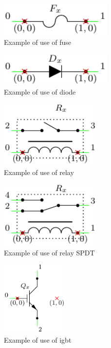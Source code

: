\documentclass[a4paper,12pt]{report}
\begin{document}
\begin{figure}[h]
\centering
\includegraphics[width=0.5\textwidth]{fuseInfo}
\caption{Example of use of fuse}
\label{fuseInfo} %
\end{figure}

\begin{figure}[h]
\centering
\includegraphics[width=0.5\textwidth]{diodeInfo}
\caption{Example of use of diode}
\label{diodeInfo} %
\end{figure}

\begin{figure}[h]
\centering
\includegraphics[width=0.45\textwidth]{relayInfo}
\caption{Example of use of relay}
\label{relayInfo} %
\end{figure}

\begin{figure}[h]
\centering
\includegraphics[width=0.45\textwidth]{relaySPDTInfo}
\caption{Example of use of relay SPDT}
\label{relaySPDTInfo} %
\end{figure}

\begin{figure}[h]
\centering
\includegraphics[width=0.3\textwidth]{igbtInfo}
\caption{Example of use of igbt}
\label{igbtrInfo} %
\end{figure}
\end{document}

